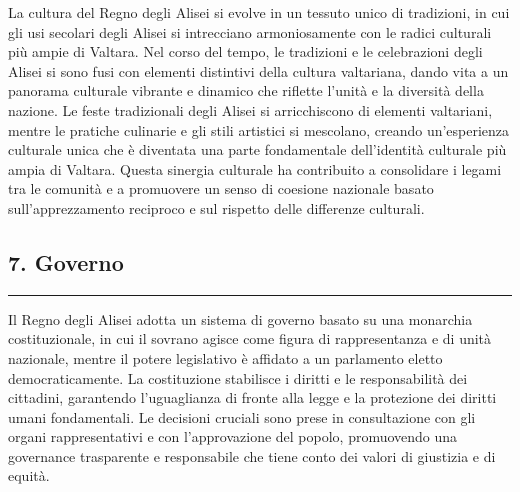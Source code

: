 La cultura del Regno degli Alisei si evolve in un tessuto unico di
tradizioni, in cui gli usi secolari degli Alisei si intrecciano
armoniosamente con le radici culturali più ampie di Valtara. Nel corso
del tempo, le tradizioni e le celebrazioni degli Alisei si sono fusi con
elementi distintivi della cultura valtariana, dando vita a un panorama
culturale vibrante e dinamico che riflette l'unità e la diversità della
nazione. Le feste tradizionali degli Alisei si arricchiscono di elementi
valtariani, mentre le pratiche culinarie e gli stili artistici si
mescolano, creando un'esperienza culturale unica che è diventata una
parte fondamentale dell'identità culturale più ampia di Valtara. Questa
sinergia culturale ha contribuito a consolidare i legami tra le comunità
e a promuovere un senso di coesione nazionale basato sull'apprezzamento
reciproco e sul rispetto delle differenze culturali.

\subsection{7. Governo}\label{governo}

\begin{center}\rule{0.5\linewidth}{0.5pt}\end{center}

Il Regno degli Alisei adotta un sistema di governo basato su una
monarchia costituzionale, in cui il sovrano agisce come figura di
rappresentanza e di unità nazionale, mentre il potere legislativo è
affidato a un parlamento eletto democraticamente. La costituzione
stabilisce i diritti e le responsabilità dei cittadini, garantendo
l'uguaglianza di fronte alla legge e la protezione dei diritti umani
fondamentali. Le decisioni cruciali sono prese in consultazione con gli
organi rappresentativi e con l'approvazione del popolo, promuovendo una
governance trasparente e responsabile che tiene conto dei valori di
giustizia e di equità.
